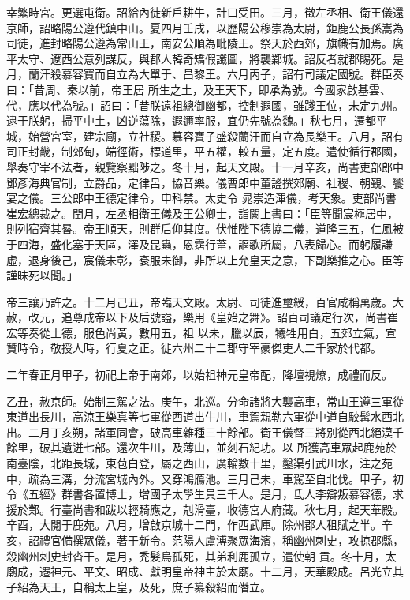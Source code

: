 \begin{pinyinscope}
 幸繁畤宮。更選屯衛。詔給內徙新戶耕牛，計口受田。三月，徵左丞相、衛王儀還京師，詔略陽公遵代鎮中山。夏四月壬戌，以歷陽公穆崇為太尉，鉅鹿公長孫嵩為司徒，進封略陽公遵為常山王，南安公順為毗陵王。祭天於西郊，旗幟有加焉。廣平太守、遼西公意列謀反，與郡人韓奇矯假讖圖，將襲鄴城。詔反者就郡賜死。是月，蘭汗殺慕容寶而自立為大單于、昌黎王。六月丙子，詔有司議定國號。群臣奏曰：「昔周、秦以前，帝王居
 所生之土，及王天下，即承為號。今國家啟基雲、代，應以代為號。」詔曰：「昔朕遠祖總御幽都，控制遐國，雖踐王位，未定九州。逮于朕躬，掃平中土，凶逆蕩除，遐邇率服，宜仍先號為魏。」秋七月，遷都平城，始營宮室，建宗廟，立社稷。慕容寶子盛殺蘭汗而自立為長樂王。八月，詔有司正封畿，制郊甸，端徑術，標道里，平五權，較五量，定五度。遣使循行郡國，舉奏守宰不法者，親覽察黜陟之。冬十月，起天文殿。十一月辛亥，尚書吏部郎中鄧彥海典官制，立爵品，定律呂，協音樂。儀曹郎中董謐撰郊廟、社稷、朝覲、饗宴之儀。三公郎中王德定律令，申科禁。太史令
 晁崇造渾儀，考天象。吏部尚書崔宏總裁之。閏月，左丞相衛王儀及王公卿士，詣闕上書曰：「臣等聞宸極居中，則列宿齊其晷。帝王順天，則群后仰其度。伏惟陛下德協二儀，道隆三五，仁風被于四海，盛化塞于天區，澤及昆蟲，恩霑行葦，謳歌所屬，八表歸心。而躬履謙虛，退身後己，宸儀未彰，袞服未御，非所以上允皇天之意，下副樂推之心。臣等謹昧死以聞。」



 帝三讓乃許之。十二月己丑，帝臨天文殿。太尉、司徒進璽綬，百官咸稱萬歲。大赦，改元，追尊成帝以下及后號謚，樂用《皇始之舞》。詔百司議定行次，尚書崔宏等奏從土德，服色尚黃，數用五，祖
 以未，臘以辰，犧牲用白，五郊立氣，宣贊時令，敬授人時，行夏之正。徙六州二十二郡守宰豪傑吏人二千家於代都。



 二年春正月甲子，初祀上帝于南郊，以始祖神元皇帝配，降壇視燎，成禮而反。



 乙丑，赦京師。始制三駕之法。庚午，北巡。分命諸將大襲高車，常山王遵三軍從東道出長川，高涼王樂真等七軍從西道出牛川，車駕親勒六軍從中道自駮髯水西北出。二月丁亥朔，諸軍同會，破高車雜種三十餘部。衛王儀督三將別從西北絕漠千餘里，破其遺迸七部。還次牛川，及薄山，並刻石紀功。以
 所獲高車眾起鹿苑於南臺陰，北距長城，東苞白登，屬之西山，廣輪數十里，鑿渠引武川水，注之苑中，疏為三溝，分流宮城內外。又穿鴻鴈池。三月己未，車駕至自北伐。甲子，初令《五經》群書各置博士，增國子太學生員三千人。是月，氐人李辯叛慕容德，求援於鄴。行臺尚書和跋以輕騎應之，剋滑臺，收德宮人府藏。秋七月，起天華殿。辛酉，大閱于鹿苑。八月，增啟京城十二門，作西武庫。除州郡人租賦之半。辛亥，詔禮官備撰眾儀，著于新令。范陽人盧溥聚眾海濱，稱幽州刺史，攻掠郡縣，殺幽州刺史封沓干。是月，禿髮烏孤死，其弟利鹿孤立，遣使朝
 貢。冬十月，太廟成，遷神元、平文、昭成、獻明皇帝神主於太廟。十二月，天華殿成。呂光立其子紹為天王，自稱太上皇，及死，庶子纂殺紹而僭立。




\end{pinyinscope}

